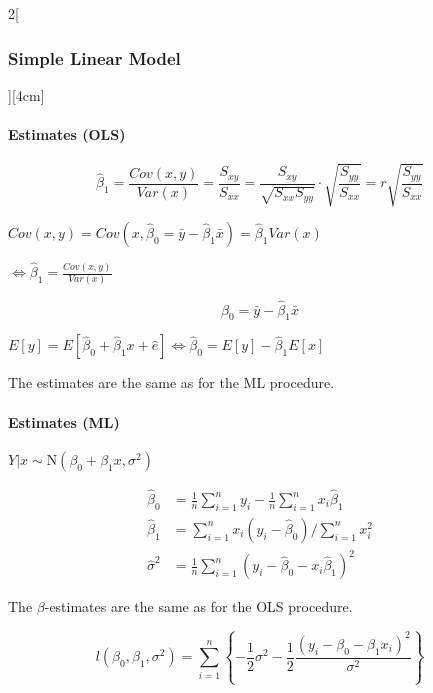 \documentclass[8pt]{extarticle}
\begin{document}
\begin{multicols}{2}[\subsubsection{Simple Linear Model}][4cm]
\paragraph{Estimates (OLS)}

$$\hat{\beta}_1=\frac{Cov(x,y)}{Var(x)}=\frac{S_{xy}}{S_{xx}}= \frac{S_{xy}}{\sqrt{S_{xx}S_{yy}}} \cdot \sqrt{\frac{S_{yy}}{S_{xx}}}=r\sqrt{\frac{S_{yy}}{S_{xx}}}$$
\begin{Proof}
$Cov(x,y)=Cov(x,\hat{\beta}_0=\bar{y}-\hat{\beta}_1\bar{x})=\hat{\beta}_1Var(x)$

\raggedleft
$ \iff \hat{\beta}_1= \frac{Cov(x,y)}{Var(x)}$
\end{Proof}
$$\hat{\beta}_0=\bar{y}-\hat{\beta}_1\bar{x}$$

\begin{Proof}
$E\left[y\right] = E\left[\hat{\beta}_0+\hat{\beta}_1 x+\hat{e}\right] \iff \hat{\beta}_0 = E\left[y\right] - \hat{\beta}_1E\left[x\right]$
\end{Proof}

The estimates are the same as for the ML procedure.

\paragraph{Estimates (ML)} $Y|x \sim \mathrm{N}(\beta_0 + \beta_1x, \sigma^2)$

\begin{align*}
\hat{\beta}_0 &= \frac{1}{n}\sum_{i=1}^n y_i - \frac{1}{n}\sum_{i=1}^n x_i \hat{\beta}_1\\
\hat{\beta}_1 &=  \sum_{i=1}^n x_i(y_i - \hat{\beta}_0)  /\sum_{i=1}^n  x_i^2\\
\hat{\sigma}^2 &= \frac{1}{n}\sum_{i=1}^n (y_i -\hat{\beta}_0 - x_i\hat{\beta}_1)^2
\end{align*}

The $\beta$-estimates are the same as for the OLS procedure.

\begin{Proof}
\vspace{-2em}
$$l(\beta_0, \beta_1,\sigma^2) = \sum_{i=1}^n\left\{-\frac{1}{2} \sigma^2 - \frac{1}{2} \frac{(y_i-\beta_0 -\beta_1x_i)^2}{\sigma^2}\right\}$$
\end{Proof}

\end{multicols}
\end{document}
